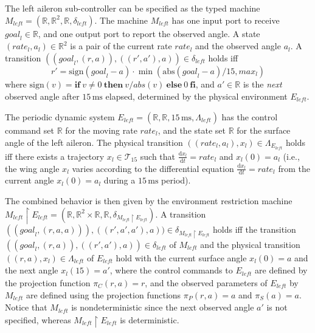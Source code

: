 \documentclass{sig-alternate}
\newcommand{\ite}[3]{\mathbf{if}\ #1\ \mathbf{then}\ #2\ \mathbf{else}\ #3\ \mathbf{fi}}
\newcommand{\abs}{\ensuremath{\mathrm{abs}}}
\newcommand{\sign}{\ensuremath{\mathrm{sign}}}
\begin{document}
The left aileron sub-controller  can be specified 
as the typed machine 
$M_\mathit{left} = (\mathbb{R}, \mathbb{R}^2, \mathbb{R}, \delta_{\mathit{left}})$.
The machine $M_\mathit{left}$ has one input port to receive $\mathit{goal}_l \in \mathbb{R}$,
and one output port to report the observed angle. %
A state $(\mathit{rate}_l, a_l) \in \mathbb{R}^2$ is a pair of the current rate $\mathit{rate}_l$ and the observed angle $a_l$.
A transition $((\mathit{goal}_l, (r, a)), ((r', a'),a)) \in  \delta_{\mathit{left}}$
holds iff 
\[
r' = \sign(\mathit{goal}_l - a) \cdot \min(\abs(\mathit{goal}_l - a) / 15, \mathit{max}_l)
\]
where $\sign(v) = \ite{v \neq 0}{v / abs(v)}{0}$, and
$a' \in \mathbb{R}$ is the \emph{next}  observed angle after $15\,\mathrm{ms}$ elapsed,
determined by the physical environment $E_\mathit{left}$.

The periodic dynamic system 
$E_\mathit{left} = (\mathbb{R}, \mathbb{R}, 15\,\mathrm{ms}, \Lambda_\mathit{left})$
has the control command set $\mathbb{R}$ for the moving rate $\mathit{rate}_l$,
and the state set $\mathbb{R}$ for the surface angle of the left aileron.
The physical transition 
$( (\mathit{rate}_l, a_l), x_l ) \in \Lambda_{E_\mathit{left}}$ holds
iff there exists a trajectory $x_l \in \mathcal{T}_{15}$ such that
$\frac{\mathrm{d} x_l}{\mathrm{d}t} = \mathit{rate}_l$ and $x_l(0) = a_l$
(i.e., the wing angle  $x_l$ varies 
according to the differential 
equation $\frac{\mathrm{d} x_l}{\mathrm{d}t} = \mathit{rate}_l$
from the current angle $x_l(0) = a_l$
during a $15\,\mathrm{ms}$ period).

The combined behavior is then given by the environment restriction machine
$M_\mathit{left} \restriction E_\mathit{left} = (\mathbb{R}, \mathbb{R}^2 \times \mathbb{R}, \mathbb{R}, \delta_{M_\mathit{left} \restriction E_\mathit{left}})$.
A transition 
$((\mathit{goal}_l, (r, a, a))), ((r',a', a'), a) ) 
\in \delta_{M_\mathit{left} \restriction E_\mathit{left}}$ 
holds iff
the transition $( (\mathit{goal}_l, (r,a)), ((r',a'),a) ) \in \delta_{\mathit{left}}$
of $M_\mathit{left}$
and the physical transition 
$((r, a), x_l) \in \Lambda_{\mathit{left}}$ of $E_\mathit{left}$ hold
with the current surface angle $x_l(0) = a$ and the next angle $x_l(15) = a'$,
where the control commands to $E_\mathit{left}$ are defined by the projection function $\pi_C(r,a) = r$,
and the observed parameters of $E_\mathit{left}$ by $M_\mathit{left}$
are defined using the projection functions $\pi_P(r,a) = a$ and $\pi_S(a) = a$.
%
Notice that $M_\mathit{left}$ is nondeterministic
since the next observed angle $a'$ is not specified,
whereas
$M_\mathit{left} \restriction E_\mathit{left}$ is deterministic.
\end{document}
